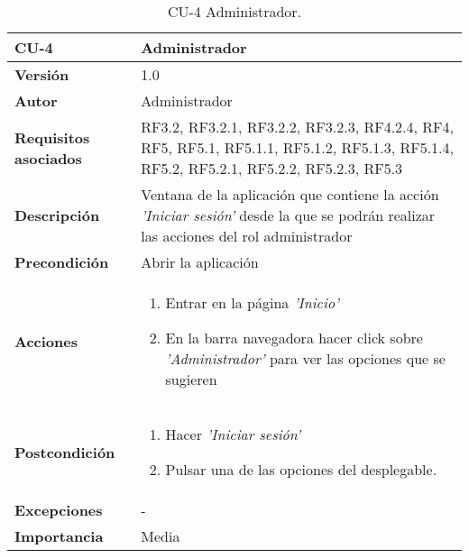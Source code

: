 \begin{table}[h!]
	\centering
	\begin{tabularx}{\linewidth}{ p{} p{} }
		\toprule
		\textbf{CU-4}    & \textbf{Administrador}\\
		\toprule
		\textbf{Versión}              & 1.0    \\
		\textbf{Autor}                & Administrador \\
		\textbf{Requisitos asociados} & RF3.2, RF3.2.1, RF3.2.2, RF3.2.3, RF4.2.4, RF4, RF5, RF5.1, RF5.1.1, RF5.1.2, RF5.1.3, RF5.1.4, RF5.2, RF5.2.1, RF5.2.2, RF5.2.3, RF5.3\\
		\textbf{Descripción}          & Ventana de la aplicación que contiene la acción \textit{'Iniciar sesión'} desde la que se podrán realizar las acciones del rol administrador  \\
        \textbf{Precondición}         & Abrir la aplicación \\
		\textbf{Acciones}             &
		\begin{enumerate}
			\def\labelenumi{\arabic{enumi}.}
			\tightlist
			\item Entrar en la página \textit{'Inicio'}
			\item En la barra navegadora hacer click sobre \textit{'Administrador'} para ver las opciones que se sugieren
		\end{enumerate}\\
		\textbf{Postcondición}     &   
        \begin{enumerate}
			\def\labelenumi{\arabic{enumi}.}
			\tightlist
			\item Hacer \textit{'Iniciar sesión'}
			\item Pulsar una de las opciones del desplegable. 
		\end{enumerate}\\
		\textbf{Excepciones}          & -\\
		\textbf{Importancia}          & Media \\
		\bottomrule
	\end{tabularx}
	\caption{CU-4 Administrador.}
\end{table}




